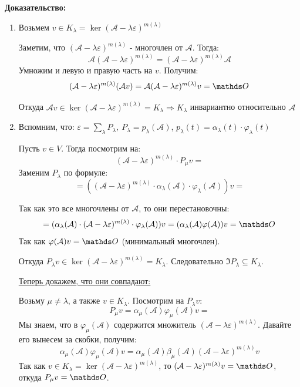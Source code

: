 \textbf{Доказательство:}
\begin{enumerate}
    \item Возьмем $v \in K_{\lambda} = \ker(\mathcal{A} - \lambda \varepsilon)^{m(\lambda)} $

    Заметим, что $(\mathcal{A} - \lambda \varepsilon)^{m(\lambda)}$  - многочлен от $\mathcal{A}$. Тогда:
    $$\mathcal{A}(\mathcal{A} - \lambda \varepsilon)^{m(\lambda)} = (\mathcal{A} - \lambda \varepsilon)^{m(\lambda)} \mathcal{A}$$
    Умножим и левую и правую часть на $v$. Получим:
    $$(\mathcal{A} - \lambda \varepsilon)^{m(\lambda)}(\mathcal{A}v)=\mathcal{A}(\mathcal{A} -\lambda \varepsilon)^{m(\lambda)}v = \zero$$


    Откуда $ \mathcal{A} v \in \ker(\mathcal{A} -\lambda \varepsilon)^{m(\lambda)} = K _{\lambda} \Rightarrow K_{\lambda} $ инвариантно относительно $\mathcal{A}$

    \item Вспомним, что: $\varepsilon = \sum\limits_{\lambda}P_{\lambda}, \ P_{\lambda }= p_{\lambda}(\mathcal{A})$, $p_{\lambda}(t)=\alpha_{\lambda}(t) \cdot \varphi_{\lambda}(t)$
   
    Пусть $v \in V$. Тогда посмотрим на:
     $$( \mathcal{A}-\lambda \varepsilon)^{m(\lambda)} \cdot P_{\mu}v = $$
    Заменим $P_{\lambda}$ по формуле:
    $$= ((\mathcal{A} -\lambda \varepsilon)^{m(\lambda)} \cdot \alpha_{\lambda}(\mathcal{A})\cdot \varphi_{\lambda}(\mathcal{A}))v =$$

    Так как это все многочлены от $\mathcal{A}$, то они перестановочны:
    $$ = (\alpha_{\lambda}(\mathcal{A})\cdot (\mathcal{A}-\lambda \varepsilon)^{m(\lambda)} \cdot \varphi_{\lambda}(\mathcal{A}))v = (\alpha_{\lambda}(\mathcal{A})\varphi(\mathcal{A}))v= \zero$$
    Так как $\varphi(\mathcal{A}) v = \zero$ (минимальный многочлен).
    


    Откуда $ P_{\lambda}v \in \ker (\mathcal{A}-\lambda \varepsilon)^{m(\lambda)} = K_{\lambda}$. Следовательно $ \Im P_{\lambda} \subseteq K_{\lambda}$.

    
    
    \uline{Теперь докажем, что они совпадают:}
    
    Возьму $\mu \ne \lambda$, а также $v \in K_{\lambda}$.  Посмотрим на $P_{\lambda}v$:
$$P_{\mu}v= \alpha_{\mu}(\mathcal{A})\varphi_{\mu}(\mathcal{A})v =$$
 Мы знаем, что в $\varphi_\mu(\mathcal{A})$ содержится множитель $(\mathcal{A}-\lambda\varepsilon)^{m(\lambda)}$. Давайте его вынесем за скобки, получим:
 $$\alpha_{\mu}(\mathcal{A})\varphi_{\mu}(\mathcal{A})v =\alpha_{\mu}(\mathcal{A})\beta_{\mu}(\mathcal{A})(\mathcal{A} -\lambda \varepsilon)^{m(\lambda)}v$$
 Так как $v \in K_{\lambda} = \ker (\mathcal{A}-\lambda \varepsilon)^{m(\lambda)}$, то $ (\mathcal{A}-\lambda \varepsilon)^{m(\lambda)}v = \zero$, откуда $P_{\mu}v = \zero$.


\end{enumerate}
